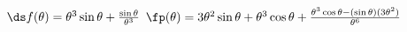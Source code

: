 {$\ds f(\theta) = \theta^3\sin\theta + \frac{\sin \theta}{\theta^3}$
}
{$\fp(\theta) = 3\theta^2\sin\theta+\theta^3\cos\theta + \frac{\theta^3\cos\theta - (\sin\theta)(3\theta^2)}{\theta^6}$
}
